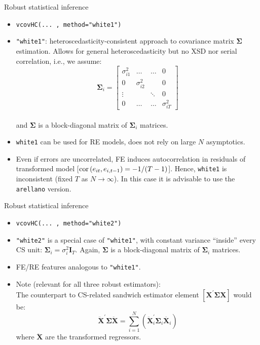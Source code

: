 \documentclass[usenames,dvipsnames]{beamer}
\begin{document}
\begin{frame}{Robust statistical inference}
\small
\begin{itemize}
    \item \texttt{vcovHC(... , method="white1")}
    \medskip
    \item \texttt{"white1"}: heteroscedasticity-consistent approach to covariance matrix $\bm{\Sigma}$ estimation. Allows for general heteroscedasticity but no XSD nor serial correlation, i.e., we assume: \\
    $$
    \bm{\Sigma}_i =
    \begin{bmatrix}
    \sigma_{i1}^2 & \dots & \dots & 0 \\
    0 & \sigma_{i2}^2 &  & 0 \\
    \vdots & & \ddots & 0 \\
    0 & \dots & \dots & \sigma_{iT}^2
    \end{bmatrix}
    $$\\
    and $\bm{\Sigma}$ is a block-diagonal matrix of $\bm{\Sigma}_i$ matrices.
    \smallskip
    \medskip
    \item[\ding{51}] \texttt{white1} can be used for RE models, does not rely on large $N$ asymptotics. \\ \smallskip 
    \item[\ding{55}] Even if errors are uncorrelated, FE induces autocorrelation in residuals of transformed model  [$\textnormal{cor}\left(e_{it},e_{i,t-1}\right)=-1/(T-1)$]. Hence, \texttt{white1} is inconsistent (fixed $T$ as $N \rightarrow \infty$). In this case it is advisable to use the \texttt{arellano} version.
\end{itemize}
\end{frame}
\begin{frame}{Robust statistical inference}
\begin{itemize}
    \item \texttt{vcovHC(... , method="white2")}
    \medskip
    \item \texttt{"white2"} is a special case of \texttt{"white1"}, with constant variance ``inside'' every CS unit: $\bm{\Sigma}_i = \sigma^2_i \bm{I}_T$. Again, $\bm{\Sigma}$ is a block-diagonal matrix of $\bm{\Sigma}_i$ matrices.
    \medskip
    \item FE/RE features analogous to \texttt{"white1"}.
    \vspace{1.5cm}
    \footnotesize
    \item Note (relevant for all three robust estimators): \\ \smallskip The counterpart to CS-related sandwich estimator element $\left[ \bm{X}^{\prime} \bm{\Sigma} \bm{X} \right]$ would be:
    $$
    \ddot{\bm{X}}^{\prime} \bm{\Sigma} \ddot{\bm{X}} = 
    \sum_{i=1}^N \left( 
    \ddot{\bm{X}}_i^{\prime} \bm{\Sigma}_i \ddot{\bm{X}_i}
    \right)
    $$
    where $\ddot{\bm{X}}$ are the transformed regressors.\\ 
\end{itemize}
\end{frame}
\end{document}
